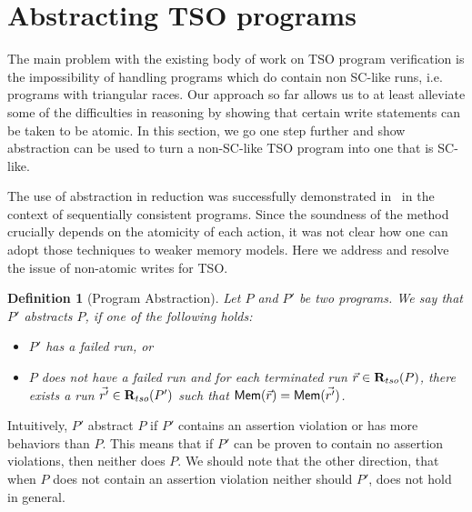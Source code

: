 \documentclass[preprint,9pt]{sigplanconf}
\begin{document}
\newtheorem{definition}{Definition}
\newtheorem{proposition}{Proposition}
\newtheorem{lemma}{Lemma}
\newtheorem{corollary}{Corollary}
\newtheorem{theorem}{Theorem}






\newcommand{\aliabsrulex}[1]{\textnormal{\sc\small #1}}
\newcommand{\alihavocval}{\ensuremath{\star}}

\section{Abstracting TSO programs}
\label{sec:abstracting-tso-programs}
The main problem with the existing body of work on TSO program verification is the impossibility of handling programs which do contain non SC-like runs, i.e. programs with triangular races.
Our approach so far allows us to at least alleviate some of the difficulties in reasoning by showing that certain write statements can be taken to be atomic.
In this section, we go one step further and show abstraction can be used to turn a non-SC-like TSO program into one that is SC-like.

The use of abstraction in reduction was successfully demonstrated in~\cite{EQT2009} in the context of sequentially consistent programs.
Since the soundness of the method crucially depends on the atomicity of each action, it was not clear how one can adopt those techniques to weaker memory models.
Here we address and resolve the issue of non-atomic writes for TSO.

\begin{definition}[Program Abstraction]
Let $P$ and $P'$ be two programs.
We say that $P'$ {\em abstracts} $P$, if one of the following holds:
\begin{itemize}
\item $P'$ has a failed run, or
\item $P$ does not have a failed run and for each terminated run $\vec{r}\in\mathbf{R}_{tso}(P)$, there exists a run $\vec{r'}\in\mathbf{R}_{tso}(P')$ such that $\mathsf{Mem}(\vec{r}) = \mathsf{Mem}(\vec{r'})$.
\end{itemize}
\end{definition}
Intuitively, $P'$ abstract $P$ if $P'$ contains an assertion violation or has more behaviors than $P$.
This means that if $P'$ can be proven to contain no assertion violations, then neither does $P$.
We should note that the other direction, that when $P$ does not contain an assertion violation neither should $P'$, does not hold in general.
\end{document}
